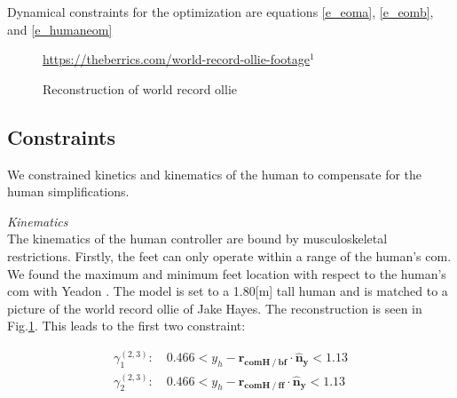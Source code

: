 \documentclass[default,iicol]{sn-jnl}
\begin{document}
Dynamical constraints for the optimization are equations \ref{e_eoma}, \ref{e_eomb}, and \ref{e_humaneom}
\begin{figure}
    \centering
    \quad
    \caption{Reconstruction of world record ollie} 
    \label{fig:f_record}
    \centering \footnotesize \url{https://theberrics.com/world-record-ollie-footage}$^{1}$%
\end{figure}

\subsection{Constraints}

We constrained kinetics and kinematics of the human to compensate for the human simplifications.

\textit{Kinematics} \\
The kinematics of the human controller are bound by musculoskeletal restrictions. Firstly, the feet can only operate within a range of the human's \gls{com}. We found the maximum and minimum feet location with respect to the human's \gls{com} with Yeadon \cite{yeadon_simulation_1990}. The model is set to a 1.80[m] tall human and is matched to a picture of the world record ollie of Jake Hayes. The reconstruction is seen in Fig.\ref{fig:f_record}. This leads to the first two constraint:


\begin{equation}\label{e_yeadon}
\begin{array}{c}
    \gamma_{1}^{(2,3)}:\quad  0.466 < y_h - \mathbf{r_{comH \mathbin{/} bf}} \cdot \mathbf{\hat n_y} < 1.13 \\ 
    \gamma_{2}^{(2,3)}:\quad  0.466 < y_h - \mathbf{r_{comH \mathbin{/} ff}} \cdot \mathbf{\hat n_y} < 1.13 
\end{array}
\end{equation}
\end{document}
